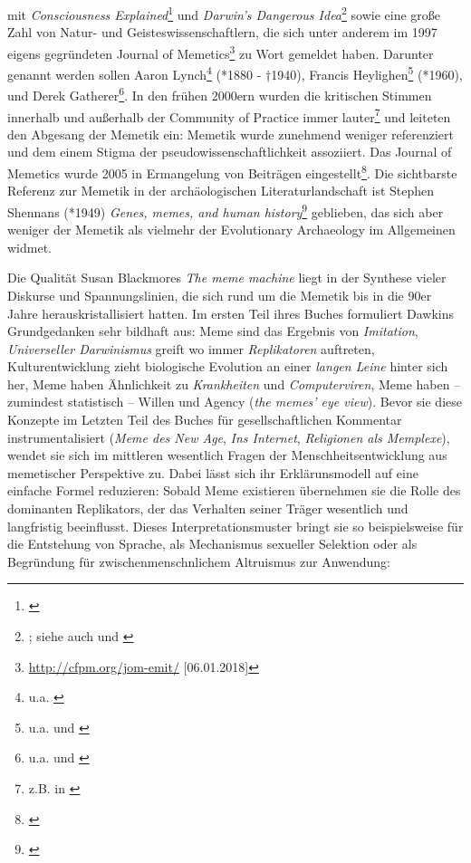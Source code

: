 \documentclass[openany,twoside,twocolumn]{book}
\let\rmarkdownfootnote\footnote%
\def\footnote{\protect\rmarkdownfootnote}
\begin{document}
mit \emph{Consciousness Explained}\footnote{\textcite{dennett_consciousness_1991}}
und \emph{Darwin's Dangerous Idea}\footnote{\textcite{dennett_darwins_1995};
  siehe auch \textcite{dennett_brainstorms_1978} und
  \textcite{dennett_elbow_1984}} sowie eine große Zahl von Natur- und
Geisteswissenschaftlern, die sich unter anderem im 1997 eigens
gegründeten Journal of Memetics\footnote{\url{http://cfpm.org/jom-emit/}
  {[}06.01.2018{]}} zu Wort gemeldet haben. Darunter genannt werden
sollen Aaron Lynch\footnote{u.a. \textcite{lynch_thought_1996}} (*1880 -
†1940), Francis Heylighen\footnote{u.a.
  \textcite{heylighen_evolution_1996} und
  \textcite{heylighen_selfish_1992}} (*1960), und Derek
Gatherer\footnote{u.a. \textcite{gatherer_identifying_2002} und
  \textcite{gatherer_spread_2002}}. In den frühen 2000ern wurden die
kritischen Stimmen innerhalb und außerhalb der Community of Practice
immer lauter\footnote{z.B. in \textcite{aunger_darwinizing_2000}} und
leiteten den Abgesang der Memetik ein: Memetik wurde zunehmend weniger
referenziert und dem einem Stigma der pseudowissenschaftlichkeit
assoziiert. Das Journal of Memetics wurde 2005 in Ermangelung von
Beiträgen eingestellt\footnote{\textcite{vada_what_2015}}. Die
sichtbarste Referenz zur Memetik in der archäologischen
Literaturlandschaft ist Stephen Shennans (*1949) \emph{Genes, memes, and
human history}\footnote{\textcite{shennan_genes_2002}} geblieben, das
sich aber weniger der Memetik als vielmehr der Evolutionary Archaeology
im Allgemeinen widmet.

Die Qualität Susan Blackmores \emph{The meme machine} liegt in der
Synthese vieler Diskurse und Spannungslinien, die sich rund um die
Memetik bis in die 90er Jahre herauskristallisiert hatten. Im ersten
Teil ihres Buches formuliert Dawkins Grundgedanken sehr bildhaft aus:
Meme sind das Ergebnis von \emph{Imitation}, \emph{Universeller
Darwinismus} greift wo immer \emph{Replikatoren} auftreten,
Kulturentwicklung zieht biologische Evolution an einer \emph{langen
Leine} hinter sich her, Meme haben Ähnlichkeit zu \emph{Krankheiten} und
\emph{Computerviren}, Meme haben -- zumindest statistisch -- Willen und
Agency (\emph{the memes' eye view}). Bevor sie diese Konzepte im Letzten
Teil des Buches für gesellschaftlichen Kommentar instrumentalisiert
(\emph{Meme des New Age}, \emph{Ins Internet}, \emph{Religionen als
Memplexe}), wendet sie sich im mittleren wesentlich Fragen der
Menschheitsentwicklung aus memetischer Perspektive zu. Dabei lässt sich
ihr Erklärunsmodell auf eine einfache Formel reduzieren: Sobald Meme
existieren übernehmen sie die Rolle des dominanten Replikators, der das
Verhalten seiner Träger wesentlich und langfristig beeinflusst. Dieses
Interpretationsmuster bringt sie so beispielsweise für die Entstehung
von Sprache, als Mechanismus sexueller Selektion oder als Begründung für
zwischenmenschnlichem Altruismus zur Anwendung:
\end{document}
